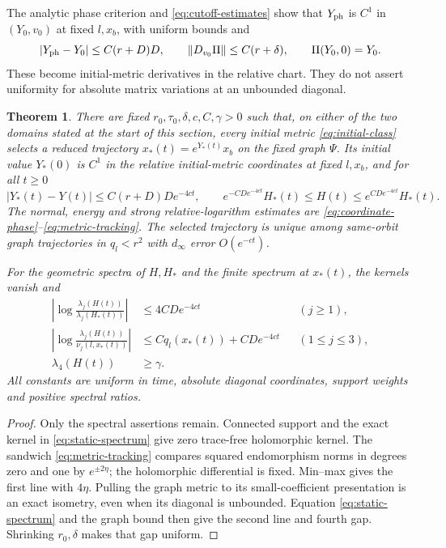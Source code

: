 \documentclass[11pt]{amsart}
\newtheorem{theorem}{Theorem}[section]
\theoremstyle{definition}
\theoremstyle{remark}
\begin{document}
The analytic phase criterion and
\eqref{eq:cutoff-estimates} show that $Y_{\rm ph}$ is $C^1$
in $(Y_0,v_0)$ at fixed $l,x_b$, with uniform bounds and
\[
 |Y_{\rm ph}-Y_0|\le C(r+D)D,\qquad
 \|D_{v_0}\Pi\|\le C(r+\delta),\qquad
 \Pi(Y_0,0)=Y_0 .
\]
These become initial-metric derivatives in the relative chart.
They do not assert uniformity for absolute matrix variations
at an unbounded diagonal.

\begin{theorem}\label{thm:local-tracking}
There are fixed $r_0,\tau_0,\delta,c,C,\gamma>0$ such that,
on either of the two domains stated at the start of this
section, every initial metric \eqref{eq:initial-class} selects
a reduced trajectory $x_*(t)=e^{Y_*(t)}x_b$ on the fixed graph
$\Psi$. Its initial value $Y_*(0)$ is $C^1$ in the relative
initial-metric coordinates at fixed $l,x_b$, and for all $t\ge0$
\[
 |Y_*(t)-Y(t)|\le C(r+D)D e^{-4ct},\qquad
 e^{-CD e^{-4ct}}H_*(t)\le H(t)\le e^{CD e^{-4ct}}H_*(t).
\]
The normal, energy and strong relative-logarithm estimates are
\eqref{eq:coordinate-phase}--\eqref{eq:metric-tracking}.
The selected trajectory is unique
among same-orbit graph trajectories in $q_l<r^2$ with
$d_\infty$ error $O(e^{-ct})$.

For the geometric spectra of $H,H_*$ and the finite spectrum
at $x_*(t)$, the kernels vanish and
\begin{equation}\label{eq:tracking-spectra}
 \begin{aligned}
 \left|\log\frac{\lambda_j(H(t))}{\lambda_j(H_*(t))}\right|
       &\le4CD e^{-4ct} &&(j\ge1),\\
 \left|\log\frac{\lambda_j(H(t))}{\nu_j(l,x_*(t))}\right|
       &\le Cq_l(x_*(t))+CD e^{-4ct} &&(1\le j\le3),\\
 \lambda_4(H(t))&\ge\gamma .
 \end{aligned}
\end{equation}
All constants are uniform in time, absolute diagonal
coordinates, support weights and positive spectral ratios.
\end{theorem}
\begin{proof}
Only the spectral assertions remain. Connected support and
the exact kernel in \eqref{eq:static-spectrum} give zero
trace-free holomorphic kernel. The sandwich
\eqref{eq:metric-tracking} compares squared endomorphism
norms in degrees zero and one by $e^{\pm2\eta}$; the
holomorphic differential is fixed. Min--max gives the first
line with $4\eta$. Pulling the graph metric to its
small-coefficient presentation is an exact isometry, even
when its diagonal is unbounded. Equation
\eqref{eq:static-spectrum} and the graph bound then give
the second line and fourth gap. Shrinking $r_0,\delta$
makes that gap uniform.
\end{proof}
\end{document}
